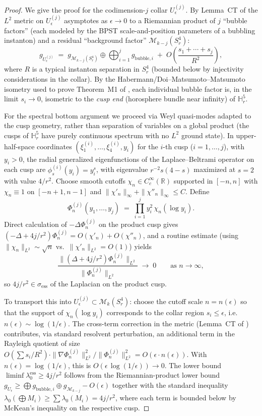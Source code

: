 \documentclass[11pt,letterpaper]{article}
\theoremstyle{definition}
\newcommand{\bbR}{\mathbb{R}}
\newcommand{\bbH}{\mathbb{H}}
\newcommand{\cM}{\mathcal{M}}
\newcommand{\Lap}{\Delta}
\begin{document}
\begin{proof}[Proof]
We give the proof for the codimension-$j$ collar $U_\epsilon^{(j)}$. By Lemma~CT of \cite{bonfioli-core} the $L^2$ metric on $U_\epsilon^{(j)}$ asymptotes as $\epsilon \to 0$ to a Riemannian product of $j$ ``bubble factors'' (each modeled by the BPST scale-and-position parameters of a bubbling instanton) and a residual ``background factor'' $\cM_{k-j}(S^4_r)$:
\[
g_{U_\epsilon^{(j)}} \;=\; g_{\cM_{k-j}(S^4_r)} \oplus \bigoplus_{i=1}^j g_{\mathrm{bubble},i} \;+\; O\!\left(\frac{s_1 + \cdots + s_j}{R^2}\right),
\]
where $R$ is a typical instanton separation in $S^4_r$ (bounded below by injectivity considerations in the collar). By the Habermann/Doi--Matsumoto--Matsumoto isometry used to prove Theorem~M1 of \cite{bonfioli-core}, each individual bubble factor is, in the limit $s_i \to 0$, isometric to the \emph{cusp end} (horosphere bundle near infinity) of $\bbH^5_r$.

\smallskip
For the spectral bottom argument we proceed via Weyl quasi-modes adapted to the cusp geometry, rather than separation of variables on a global product (the cusps of $\bbH^5_r$ have purely continuous spectrum with no $L^2$ ground state). In upper-half-space coordinates $(\xi^{(i)}_1, \ldots, \xi^{(i)}_4, y_i)$ for the $i$-th cusp ($i = 1, \ldots, j$), with $y_i > 0$, the radial generalized eigenfunctions of the Laplace--Beltrami operator on each cusp are $\phi^{(i)}_s(y_i) = y_i^s$, with eigenvalue $r^{-2} s(4-s)$ maximized at $s = 2$ with value $4/r^2$. Choose smooth cutoffs $\chi_n \in C_c^\infty(\bbR)$ supported in $[-n, n]$ with $\chi_n \equiv 1$ on $[-n+1, n-1]$ and $\|\chi'_n\|_\infty + \|\chi''_n\|_\infty \le C$. Define
\[
\Phi^{(j)}_n(y_1, \ldots, y_j) \;=\; \prod_{i=1}^j y_i^2\,\chi_n(\log y_i).
\]
Direct calculation of $-\Lap\Phi^{(j)}_n$ on the product cusp gives $(-\Lap + 4j/r^2)\Phi^{(j)}_n = O(\chi'_n) + O(\chi''_n)$, and a routine estimate (using $\|\chi_n\|_{L^2} \sim \sqrt{n}$ vs.\ $\|\chi'_n\|_{L^2} = O(1)$) yields
\[
\frac{\|(\Lap + 4j/r^2)\Phi^{(j)}_n\|_{L^2}}{\|\Phi^{(j)}_n\|_{L^2}} \;\longrightarrow\; 0 \qquad\text{as } n \to \infty,
\]
so $4j/r^2 \in \sigma_{\mathrm{ess}}$ of the Laplacian on the product cusp.

\smallskip
To transport this into $U_\epsilon^{(j)} \subset \cM_k(S^4_r)$: choose the cutoff scale $n = n(\epsilon)$ so that the support of $\chi_n(\log y_i)$ corresponds to the collar region $s_i \le \epsilon$, i.e.\ $n(\epsilon) \sim \log(1/\epsilon)$. The cross-term correction in the metric (Lemma~CT of \cite{bonfioli-core}) contributes, via standard resolvent perturbation, an additional term in the Rayleigh quotient of size $O(\sum s_i/R^2) \cdot \|\nabla\Phi^{(j)}_n\|^2_{L^2}/\|\Phi^{(j)}_n\|^2_{L^2} = O(\epsilon \cdot n(\epsilon))$. With $n(\epsilon) = \log(1/\epsilon)$, this is $O(\epsilon\,\log(1/\epsilon)) \to 0$. The lower bound $\liminf \lambda_0^{\mathrm{ess}} \ge 4j/r^2$ follows from the Riemannian-product lower bound $g_{U_\epsilon} \ge \bigoplus g_{\mathrm{bubble},i} \oplus g_{\cM_{k-j}} - O(\epsilon)$ together with the standard inequality $\lambda_0(\bigoplus M_i) \ge \sum \lambda_0(M_i) = 4j/r^2$, where each term is bounded below by McKean's inequality on the respective cusp.
\end{proof}
\end{document}
